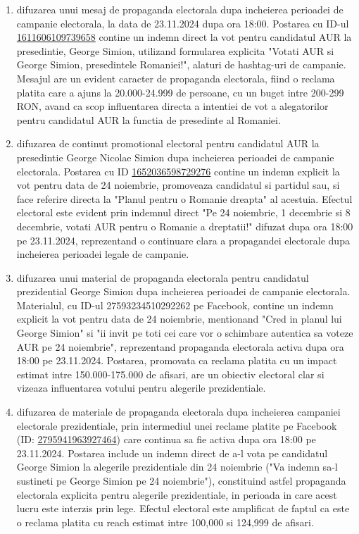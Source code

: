 \documentclass[a4paper,12pt]{article}
\begin{document}
\begin{enumerate}[leftmargin=*, label=\arabic*.)]
    \item difuzarea unui mesaj de propaganda electorala dupa incheierea perioadei de campanie electorala, la data de 23.11.2024 dupa ora 18:00. Postarea cu ID-ul \href{https://www.facebook.com/ads/library/?id=1611606109739658}{1611606109739658} contine un indemn direct la vot pentru candidatul AUR la presedintie, George Simion, utilizand formularea explicita "Votati AUR si George Simion, presedintele Romaniei!", alaturi de hashtag-uri de campanie. Mesajul are un evident caracter de propaganda electorala, fiind o reclama platita care a ajuns la 20.000-24.999 de persoane, cu un buget intre 200-299 RON, avand ca scop influentarea directa a intentiei de vot a alegatorilor pentru candidatul AUR la functia de presedinte al Romaniei.
    \item difuzarea de continut promotional electoral pentru candidatul AUR la presedintie George Nicolae Simion dupa incheierea perioadei de campanie electorala. Postarea cu ID \href{https://www.facebook.com/ads/library/?id=1652036598729276}{1652036598729276} contine un indemn explicit la vot pentru data de 24 noiembrie, promoveaza candidatul si partidul sau, si face referire directa la "Planul pentru o Romanie dreapta" al acestuia. Efectul electoral este evident prin indemnul direct "Pe 24 noiembrie, 1 decembrie si 8 decembrie, votati AUR pentru o Romanie a dreptatii!" difuzat dupa ora 18:00 pe 23.11.2024, reprezentand o continuare clara a propagandei electorale dupa incheierea perioadei legale de campanie.
    \item difuzarea unui material de propaganda electorala pentru candidatul prezidential George Simion dupa incheierea perioadei de campanie electorala. Materialul, cu ID-ul 27593234510292262 pe Facebook, contine un indemn explicit la vot pentru data de 24 noiembrie, mentionand "Cred in planul lui George Simion" si "ii invit pe toti cei care vor o schimbare autentica sa voteze AUR pe 24 noiembrie", reprezentand propaganda electorala activa dupa ora 18:00 pe 23.11.2024. Postarea, promovata ca reclama platita cu un impact estimat intre 150.000-175.000 de afisari, are un obiectiv electoral clar si vizeaza influentarea votului pentru alegerile prezidentiale.
    \item difuzarea de materiale de propaganda electorala dupa incheierea campaniei electorale prezidentiale, prin intermediul unei reclame platite pe Facebook (ID: \href{https://www.facebook.com/ads/library/?id=2795941963927464}{2795941963927464}) care continua sa fie activa dupa ora 18:00 pe 23.11.2024. Postarea include un indemn direct de a-l vota pe candidatul George Simion la alegerile prezidentiale din 24 noiembrie ("Va indemn sa-l sustineti pe George Simion pe 24 noiembrie"), constituind astfel propaganda electorala explicita pentru alegerile prezidentiale, in perioada in care acest lucru este interzis prin lege. Efectul electoral este amplificat de faptul ca este o reclama platita cu reach estimat intre 100,000 si 124,999 de afisari.

\end{enumerate}
\end{document}
